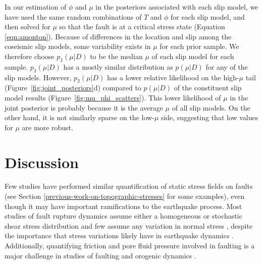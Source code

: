 \documentclass[draft,jgrga]{AGUTeX}
\begin{document}
\begin{article}
In our estimation of $\phi$ and $\mu$ in the posteriors associated with
each slip model, we have used the same random combinations of $T$ and
$\phi$ for each slip model, and then solved for $\mu$ so that the fault
is at a critical stress state (Equation \ref{eqn:amonton}). Because of
differences in the location and slip among the coseismic slip models,
some variability exists in $\mu$ for each prior sample. We therefore
choose $p_{\mathrm{J}}(\mu | D)$ to be the median $\mu$ of each slip
model for each sample. $p_{\mathrm{J}}(\mu | D)$ has a mostly similar
distribution as $p(\mu | D)$ for any of the slip models. However,
$p_{\mathrm{J}}(\mu | D)$ has a lower relative likelihood on the
high-$\mu$ tail (Figure~\ref{fig:joint_posteriors}d) compared to
$p(\mu | D)$ of the constituent slip model results (Figure~\ref{fig:mu_phi_scatters}). This lower
likelihood of $\mu$ in the joint posterior is probably because it is the
average $\mu$ of all slip models. On the other hand, it is not similarly
sparse on the low-$\mu$ side, suggesting that low values for $\mu$ are
more robust.


\section{Discussion}\label{discussion}

Few studies have performed similar quantification of static stress
fields on faults (see Section
\ref{previous-work-on-topographic-stresses} for some examples), even
though it may have important ramifications to the earthquake process.
Most studies of fault rupture dynamics
assume either a homogeneous or stochastic shear stress distribution
\citep[e.g.,][]{oglesbyday2002} and few assume any variation in normal
stress \citep[e.g.,][]{aagaard2001}, despite the importance that stress
variations likely have in earthquake dynamics \citep[e.g.,][]{day1982,
olsen1997}. Additionally, quantifying friction and pore fluid
pressure involved in faulting is a major challenge in studies of
faulting and orogenic dynamics \citep[e.g.,][]{meissner1982,
oglesbyday2002}.


\end{article}
\end{document}
